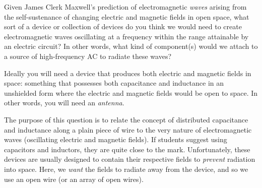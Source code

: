 

Given James Clerk Maxwell's prediction of electromagnetic {\it waves} arising from the self-sustenance of changing electric and magnetic fields in open space, what sort of a device or collection of devices do you think we would need to create electromagnetic waves oscillating at a frequency within the range attainable by an electric circuit?  In other words, what kind of component(s) would we attach to a source of high-frequency AC to radiate these waves?







Ideally you will need a device that produces both electric and magnetic fields in space: something that possesses both capacitance and inductance in an unshielded form where the electric and magnetic fields would be open to space.  In other words, you will need an {\it antenna}.







The purpose of this question is to relate the concept of distributed capacitance and inductance along a plain piece of wire to the very nature of electromagnetic waves (oscillating electric and magnetic fields).  If students suggest using capacitors and inductors, they are quite close to the mark.  Unfortunately, these devices are usually designed to contain their respective fields to {\it prevent} radiation into space.  Here, we {\it want} the fields to radiate away from the device, and so we use an open wire (or an array of open wires).




